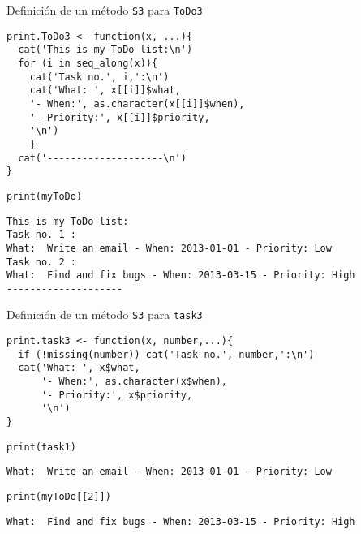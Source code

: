 \documentclass[xcolor={usenames,svgnames,dvipsnames}]{beamer}
\begin{document}
\begin{frame}[fragile,label=sec-2-2-3]{Definición de un método \texttt{S3} para \texttt{ToDo3}}
 \lstset{language=R,numbers=none}
\begin{lstlisting}
print.ToDo3 <- function(x, ...){
  cat('This is my ToDo list:\n')
  for (i in seq_along(x)){
    cat('Task no.', i,':\n')
    cat('What: ', x[[i]]$what,
	'- When:', as.character(x[[i]]$when),
	'- Priority:', x[[i]]$priority,
	'\n')
    }
  cat('--------------------\n')
}
\end{lstlisting}

\lstset{language=R,numbers=none}
\begin{lstlisting}
print(myToDo)
\end{lstlisting}

\begin{verbatim}
This is my ToDo list:
Task no. 1 :
What:  Write an email - When: 2013-01-01 - Priority: Low 
Task no. 2 :
What:  Find and fix bugs - When: 2013-03-15 - Priority: High 
--------------------
\end{verbatim}
\end{frame}
\begin{frame}[fragile,label=sec-2-2-4]{Definición de un método \texttt{S3} para \texttt{task3}}
 \lstset{language=R,numbers=none}
\begin{lstlisting}
print.task3 <- function(x, number,...){
  if (!missing(number)) cat('Task no.', number,':\n')
  cat('What: ', x$what,
      '- When:', as.character(x$when),
      '- Priority:', x$priority,
      '\n')
}
\end{lstlisting}

\lstset{language=R,numbers=none}
\begin{lstlisting}
print(task1)
\end{lstlisting}

\begin{verbatim}
What:  Write an email - When: 2013-01-01 - Priority: Low
\end{verbatim}

\lstset{language=R,numbers=none}
\begin{lstlisting}
print(myToDo[[2]])
\end{lstlisting}

\begin{verbatim}
What:  Find and fix bugs - When: 2013-03-15 - Priority: High
\end{verbatim}
\end{frame}
\end{document}
